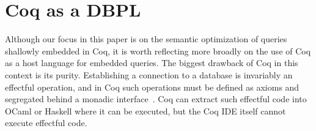 \documentclass[preprint]{sigplanconf}
\begin{document}
%
%




\section{Coq as a DBPL}

Although our focus in this paper is on the semantic optimization of queries shallowly embedded in Coq, it is worth reflecting more broadly on the use of Coq as a host language for embedded queries.  The biggest drawback of Coq in this context is its purity.  Establishing a connection to a database is invariably an effectful operation, and in Coq such operations must be defined as axioms and segregated behind a monadic interface~\cite{Malecha:2010:TVR:1706299.1706329}.  Coq can extract such effectful code into OCaml or Haskell where it can be executed, but the Coq IDE itself cannot execute effectful code.
\end{document}
